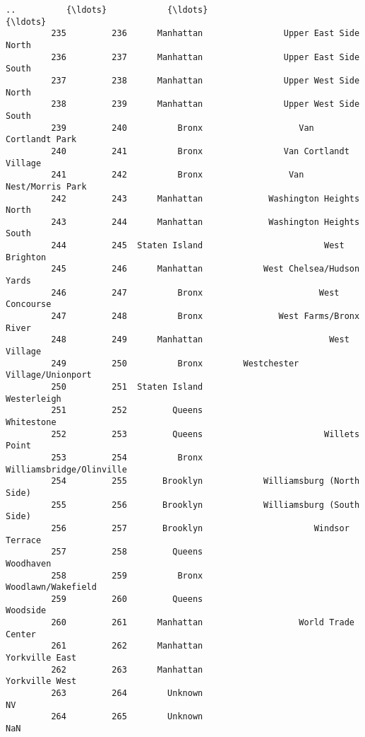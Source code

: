 \documentclass[11pt]{article}
\begin{document}
\begin{Verbatim}[commandchars=\\\{\}]
         ..          {\ldots}            {\ldots}                                  {\ldots}   
         235         236      Manhattan                Upper East Side North   
         236         237      Manhattan                Upper East Side South   
         237         238      Manhattan                Upper West Side North   
         238         239      Manhattan                Upper West Side South   
         239         240          Bronx                   Van Cortlandt Park   
         240         241          Bronx                Van Cortlandt Village   
         241         242          Bronx                 Van Nest/Morris Park   
         242         243      Manhattan             Washington Heights North   
         243         244      Manhattan             Washington Heights South   
         244         245  Staten Island                        West Brighton   
         245         246      Manhattan            West Chelsea/Hudson Yards   
         246         247          Bronx                       West Concourse   
         247         248          Bronx               West Farms/Bronx River   
         248         249      Manhattan                         West Village   
         249         250          Bronx        Westchester Village/Unionport   
         250         251  Staten Island                          Westerleigh   
         251         252         Queens                           Whitestone   
         252         253         Queens                        Willets Point   
         253         254          Bronx             Williamsbridge/Olinville   
         254         255       Brooklyn            Williamsburg (North Side)   
         255         256       Brooklyn            Williamsburg (South Side)   
         256         257       Brooklyn                      Windsor Terrace   
         257         258         Queens                            Woodhaven   
         258         259          Bronx                   Woodlawn/Wakefield   
         259         260         Queens                             Woodside   
         260         261      Manhattan                   World Trade Center   
         261         262      Manhattan                       Yorkville East   
         262         263      Manhattan                       Yorkville West   
         263         264        Unknown                                   NV   
         264         265        Unknown                                  NaN   
         

\end{Verbatim}
\end{document}
